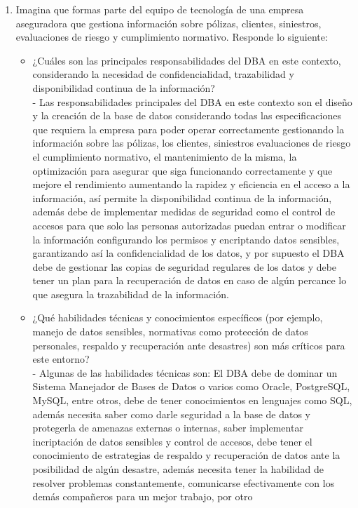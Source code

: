\documentclass[12pt]{report}
\begin{document}
\begin{enumerate}[label=\textbf{\arabic*.}, leftmargin=*]
\begin{enumerate}[label=\textbf{\alph*.}, leftmargin=*, itemsep=1.0em]
\item Imagina que formas parte del equipo de tecnolog\'ia de una empresa aseguradora que gestiona informaci\'on sobre p\'olizas, clientes, siniestros, evaluaciones de riesgo y cumplimiento normativo. Responde lo siguiente:
\begin{itemize}
  \item ¿Cu\'ales son las principales responsabilidades del DBA en este contexto, considerando la necesidad de confidencialidad, trazabilidad y disponibilidad continua de la informaci\'on?\\
  - Las responsabilidades principales del DBA en este contexto son el diseño y la creación de la base de datos considerando todas las especificaciones que requiera la empresa para poder operar correctamente gestionando la información sobre las pólizas, los clientes, siniestros
  evaluaciones de riesgo el cumplimiento normativo, el mantenimiento de la misma, la optimización para asegurar que siga funcionando correctamente y que mejore el rendimiento aumentando la rapidez y eficiencia en el acceso a la información, así permite la disponibilidad continua de la información, además
  debe de implementar medidas de seguridad como el control de accesos para que solo las personas autorizadas puedan entrar o modificar la información configurando los permisos y encriptando datos sensibles, garantizando así la confidencialidad de los datos, y por supuesto el DBA debe de gestionar las
  copias de seguridad regulares de los datos y debe tener un plan para la recuperación de datos en caso de algún percance lo que asegura la trazabilidad de la información.
  \item ¿Qu\'e habilidades t\'ecnicas y conocimientos espec\'ificos (por ejemplo, manejo de datos sensibles, normativas como protecci\'on de datos personales, respaldo y recuperaci\'on ante desastres) son m\'as cr\'iticos para este entorno?\\
  - Algunas de las habilidades técnicas son: El DBA debe de dominar un Sistema Manejador de Bases de Datos o varios como Oracle, PostgreSQL, MySQL, entre otros, debe de tener conocimientos en lenguajes como SQL, además necesita saber como darle seguridad a la base de datos y protegerla de amenazas externas o internas,
  saber implementar incriptación de datos sensibles y control de accesos, debe tener el conocimiento de estrategias de respaldo y recuperación de datos ante la posibilidad de algún desastre, además necesita tener la habilidad de resolver problemas constantemente, comunicarse efectivamente con los demás compañeros para un mejor trabajo, por otro

\end{itemize}
\end{enumerate}
\end{enumerate}
\end{document}
